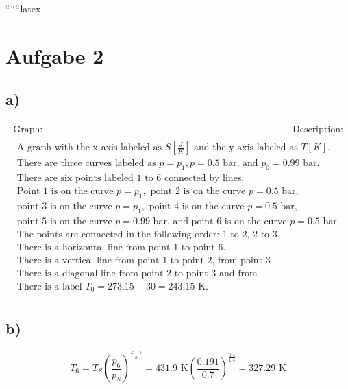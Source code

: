 
``````latex


\section*{Aufgabe 2}

\subsection*{a)}

\[
\begin{array}{c}
\begin{array}{c|c}
\text{Graph:} & \text{Description:} \\
\hline
\begin{array}{c}
\text{A graph with the x-axis labeled as } S \left[\frac{J}{K}\right] \text{ and the y-axis labeled as } T[K]. \\
\text{There are three curves labeled as } p = p_1, p = 0.5 \text{ bar, and } p_0 = 0.99 \text{ bar.} \\
\text{There are six points labeled 1 to 6 connected by lines.} \\
\text{Point 1 is on the curve } p = p_1, \text{ point 2 is on the curve } p = 0.5 \text{ bar,} \\
\text{point 3 is on the curve } p = p_1, \text{ point 4 is on the curve } p = 0.5 \text{ bar,} \\
\text{point 5 is on the curve } p = 0.99 \text{ bar, and point 6 is on the curve } p = 0.5 \text{ bar.} \\
\text{The points are connected in the following order: 1 to 2, 2 to 3, 3 to 4, 4 to 5, 5 to 6.} \\
\text{There is a horizontal line from point 1 to point 6.} \\
\text{There is a vertical line from point 1 to point 2, from point 3 to point 4, and from point 5 to point 6.} \\
\text{There is a diagonal line from point 2 to point 3 and from point 4 to point 5.} \\
\text{There is a label } T_0 = 273.15 - 30 = 243.15 \text{ K.}
\end{array}
\end{array}
\end{array}
\]

\subsection*{b)}

\[
T_6 = T_S \left( \frac{p_6}{p_S} \right)^{\frac{k-1}{k}} = 431.9 \text{ K} \left( \frac{0.191}{0.7} \right)^{\frac{0.4}{1.4}} = 327.29 \text{ K}
\]


